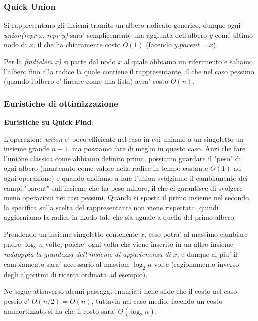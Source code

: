 \documentclass{article}
\begin{document}
\subsubsection{Quick Union}

Si rappresentano gli insiemi tramite un albero radicato generico, dunque ogni
\emph{union(repr x, repr y)} sara' semplicemente una aggiunta dell'albero $y$ come
ultimo nodo di $x$, il che ha chiaramente costo $O(1)$ (facendo $y.parent = x$).

Per la \emph{find(elem x)} si parte dal nodo $x$ al quale abbiamo un riferimento
e saliamo l'albero fino alla radice la quale contiene il rappresentante, il che
nel caso pessimo (quando l'albero e' lineare come una lista) avra' costo $O(n)$.

\subsubsection{Euristiche di ottimizzazione}

\textbf{Euristiche su Quick Find}:

L'operazione \emph{union} e' poco efficiente nel caso in cui uniamo a un singoletto
un insieme grande $n-1$, ma possiamo fare di meglio in questo caso. Anzi che fare
l'unione classica come abbiamo definito prima, possiamo guardare il "peso" di ogni
albero (mantenuto come valore nella radice in tempo costante $O(1)$ ad ogni operazione)
e quando andiamo a fare l'union svolgiamo il cambiamento dei campi "parent"
sull'insieme che ha peso minore, il che ci garantisce di svolgere meno operazioni
nei casi pessimi. Quando si sposta il primo insieme nel secondo, la specifica sulla
scelta del rappresentante non viene rispettata, quindi aggiorniamo la radice in
modo tale che sia uguale a quella del primo albero.

Prendendo un insieme singoletto contenente $x$, esso potra' al massimo cambiare
padre $\log_2 n$ volte, poiche' ogni volta che viene inserito in un altro
insieme \emph{raddoppia la grandezza dell'insieme di appartenenza di $x$}, e dunque
al piu' il cambiamento sara' necessario al massiom $\log_2 n$ volte (ragionamento
inverso degli algoritmi di ricerca ordinata ad esempio).

Ne segue attraverso alcuni passaggi enunciati nelle slide che il costo nel caso
pessio e' $O(n/2) = O(n)$, tuttavia nel caso medio, facendo un costo ammortizzato
si ha che il costo sara' $O(\log_2 n)$. \\ \\
\end{document}
